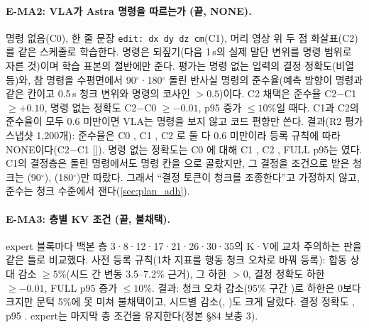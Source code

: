\paragraph{E-MA2: VLA가 Astra 명령을 따르는가 (끝, NONE).} 명령 없음(C0), 한 줄 문장 \texttt{edit: dx dy dz cm}(C1), 머리 영상 위 두 점 화살표(C2)를 같은 스케줄로 학습한다. 명령은 되짚기(다음 1\,s의 실제 말단 변위를 명령 범위로 자른 것)이며 학습 표본의 절반에만 준다. 평가는 명령 없는 입력의 결정 정확도(비열등)와, 참 명령을 수평면에서 90$^\circ$·180$^\circ$ 돌린 반사실 명령의 준수율(예측 방향이 명령과 같은 칸이고 0.5\,s 청크 변위와 명령의 코사인 $>0.5$)이다. C2 채택은 준수율 C2$-$C1 $\ge+0.10$, 명령 없는 정확도 C2$-$C0 $\ge-0.01$, p95 증가 $\le10\%$일 때다. C1과 C2의 준수율이 모두 0.6 미만이면 VLA는 명령을 보지 않고 코드 편향만 쓴다. 결과(R2 평가 스냅샷 1,200개): 준수율은 C0 , C1 , C2 로 둘 다 0.6 미만이라 등록 규칙에 따라 NONE이다(C2$-$C1  []). 명령 없는 정확도는 C0 에 대해 C1 , C2 , FULL p95는 였다. C1의 결정층은 돌린 명령에서도 명령 칸을 으로 골랐지만, 그 결정을 조건으로 받은 청크는 (90$^\circ$), (180$^\circ$)만 따랐다. 그래서 ``결정 토큰이 청크를 조종한다''고 가정하지 않고, 준수는 청크 수준에서 잰다(\cref{sec:plan_adh}).

\paragraph{E-MA3: 층별 KV 조건 (끝, 불채택).} expert 블록마다 백본 층 3·8·12·17·21·26·30·35의 K·V에 교차 주의하는 판을 같은 틀로 비교했다. 사전 등록 규칙(1차 지표를 행동 청크 오차로 바꿔 등록): 합동 상대 감소 $\ge5\%$(시드 간 변동 3.5--7.2\% 근거), 그 하한 $>0$, 결정 정확도 하한 $\ge-0.01$, FULL p95 증가 $\le10\%$. 결과: 청크 오차  감소(95\% 구간 \tentative{[1.48, 2.88]\%})로 하한은 0보다 크지만 문턱 5\%에 못 미쳐 불채택이고, 시드별 감소(, )도 크게 달랐다. 결정 정확도 , p95 . expert는 마지막 층 조건을 유지한다(정본 §84 보충 3).

